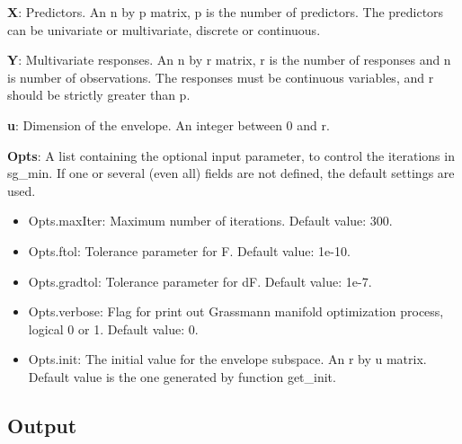 \documentclass[a4paper,11pt,openany]{memoir}
\begin{document}
\begin{par}
\textbf{X}: Predictors. An n by p matrix, p is the number of predictors. The predictors can be univariate or multivariate, discrete or continuous.
\end{par} \vspace{1em}
\begin{par}
\textbf{Y}: Multivariate responses. An n by r matrix, r is the number of responses and n is number of observations. The responses must be continuous variables, and r should be strictly greater than p.
\end{par} \vspace{1em}
\begin{par}
\textbf{u}: Dimension of the envelope. An integer between 0 and r.
\end{par} \vspace{1em}
\begin{par}
\textbf{Opts}: A list containing the optional input parameter, to control the iterations in sg\_min. If one or several (even all) fields are not defined, the default settings are used.
\end{par} \vspace{1em}
\begin{itemize}
\setlength{\itemsep}{-1ex}
   \item Opts.maxIter: Maximum number of iterations.  Default value: 300.
   \item Opts.ftol: Tolerance parameter for F.  Default value: 1e-10.
   \item Opts.gradtol: Tolerance parameter for dF.  Default value: 1e-7.
   \item Opts.verbose: Flag for print out Grassmann manifold optimization process, logical 0 or 1. Default value: 0.
   \item Opts.init: The initial value for the envelope subspace. An r by u matrix. Default value is the one generated by function get\_init.

\end{itemize}


\subsection*{Output}
\end{document}

